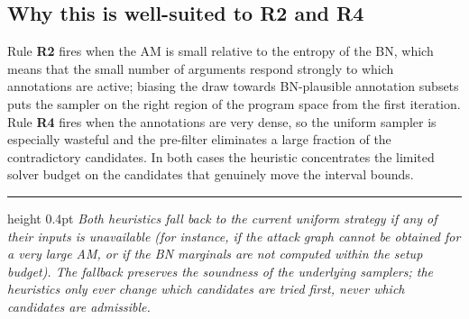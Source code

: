 \documentclass[11pt,a4paper]{article}
\begin{document}
\subsection*{Why this is well-suited to R2 and R4}

Rule \textbf{R2} fires when the AM is small relative to the entropy of the BN, which means that the small number of arguments respond strongly to which annotations are active; biasing the draw towards BN-plausible annotation subsets puts the sampler on the right region of the program space from the first iteration. Rule \textbf{R4} fires when the annotations are very dense, so the uniform sampler is especially wasteful and the pre-filter eliminates a large fraction of the contradictory candidates. In both cases the heuristic concentrates the limited solver budget on the candidates that genuinely move the interval bounds.

\vspace{6pt}
\hrule height 0.4pt
\vspace{4pt}
\footnotesize\textit{Both heuristics fall back to the current uniform strategy if any of their inputs is unavailable (for instance, if the attack graph cannot be obtained for a very large AM, or if the BN marginals are not computed within the setup budget). The fallback preserves the soundness of the underlying samplers; the heuristics only ever change which candidates are tried first, never which candidates are admissible.}
\end{document}
